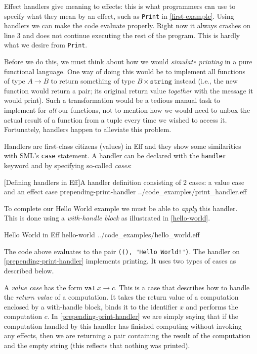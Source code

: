 \documentclass[class=article, crop=false]{standalone}
\begin{document}
Effect handlers give meaning to effects: this is what programmers can use to
specify what they mean by an effect, such as \lstinline{Print} in
\autoref{first-example}. Using handlers we can make the code evaluate properly.
Right now it always crashes on line 3 and does not continue executing the rest
of the program. This is hardly what we desire from \lstinline{Print}.

Before we do this, we must think about how we would \emph{simulate printing} in
a pure functional language. One way of doing this would be to implement all
functions of type $A \to B$ to return something of type $B \times \mathtt{string}$
instead (i.e., the new function would return a pair; its original return value
\emph{together} with the message it would print). Such a transformation would be
a tedious manual task to implement for \emph{all} our functions, not to mention
how we would need to unbox the actual result of a function from a tuple every
time we wished to access it. Fortunately, handlers happen to alleviate this
problem.

Handlers are first-class citizens (values) in Eff and they show some similarities
with SML's \lstinline|case| statement. A handler can be declared with the
\lstinline|handler| keyword and by specifying so-called \emph{cases}:

{[Defining handlers in Eff]A handler definition consisting of 2 cases: a value case and an effect case}
{prepending-print-handler}
{../code_examples/print_handler.eff}

To complete our Hello World example we must be able to \emph{apply} this handler.
This is done using a \emph{with-handle block} as illustrated in \autoref{hello-world}.

{Hello World in Eff}
{hello-world}
{../code_examples/hello_world.eff}

The code above evaluates to the pair \texttt{((), "Hello World!")}. The handler
on \autoref{prepending-print-handler} implements printing. It uses two types of
cases as described below.

A \emph{value case} has the form $\mathtt{val}\ x \to c$. This is a case that
describes how to handle the \emph{return value} of a computation. It takes the
return value of a computation enclosed by a with-handle block, binds it to the
identifier $x$ and performs the computation $c$. In \autoref{prepending-print-handler}
we are simply saying that if the computation handled by this handler has finished
computing without invoking any effects, then we are returning a pair containing
the result of the computation and the empty string (this reflects that nothing
was printed).
\end{document}
